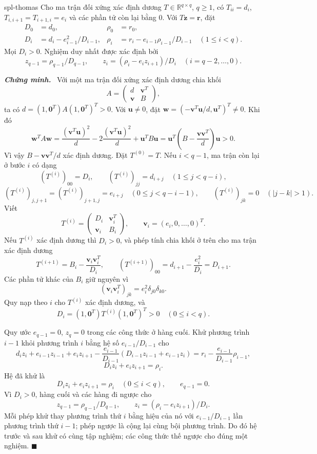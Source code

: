 \documentclass[12pt,a4paper,oneside]{book}
\numberwithin{algorithm}{chapter}
\theoremstyle{definition}
\newenvironment{chungminh}{\par\medskip\noindent\textbf{\textit{\color{mainblue}Chứng minh.}}\ }{\hfill$\blacksquare$\par\medskip}
\newcommand{\R}{\mathbb{R}}
\begin{document}
\begin{dinhly}{}{spl-thomas}
Cho ma trận đối xứng xác định dương $T\in\R^{q\times q}$, $q\geq1$, có $T_{ii}=d_i$, $T_{i,i+1}=T_{i+1,i}=e_i$ và các phần tử còn lại bằng $0$. Với $T\mathbf z=\mathbf r$, đặt
\begin{equation}\label{eq:spl-thomas}
 \begin{aligned}
 D_0&=d_0,&\rho_0&=r_0,\\
 D_i&=d_i-e_{i-1}^2/D_{i-1},&
 \rho_i&=r_i-e_{i-1}\rho_{i-1}/D_{i-1}\quad(1\leq i<q).
 \end{aligned}
\end{equation}
Mọi $D_i>0$. Nghiệm duy nhất được xác định bởi
\[
 z_{q-1}=\rho_{q-1}/D_{q-1},\qquad
 z_i=(\rho_i-e_iz_{i+1})/D_i\quad(i=q-2,\ldots,0).
\]
\end{dinhly}
\begin{chungminh}
Với một ma trận đối xứng xác định dương chia khối
\[
 A=\begin{pmatrix}d&\mathbf v^T\\\mathbf v&B\end{pmatrix},
\]
ta có $d=(1,\mathbf0^T)A(1,\mathbf0^T)^T>0$. Với $\mathbf u\ne0$, đặt $\mathbf w=(-\mathbf v^T\mathbf u/d,\mathbf u^T)^T\ne0$. Khi đó
\[
 \mathbf w^TA\mathbf w
 =\frac{(\mathbf v^T\mathbf u)^2}{d}-2\frac{(\mathbf v^T\mathbf u)^2}{d}+\mathbf u^TB\mathbf u
 =\mathbf u^T\left(B-\frac{\mathbf v\mathbf v^T}{d}\right)\mathbf u>0.
\]
Vì vậy $B-\mathbf v\mathbf v^T/d$ xác định dương. Đặt $T^{(0)}=T$. Nếu $i<q-1$, ma trận còn lại ở bước $i$ có dạng
\[
 (T^{(i)})_{00}=D_i,\qquad
 (T^{(i)})_{jj}=d_{i+j}\quad(1\leq j<q-i),
\]
\[
 (T^{(i)})_{j,j+1}=(T^{(i)})_{j+1,j}=e_{i+j}
 \quad(0\leq j<q-i-1),\qquad
 (T^{(i)})_{jk}=0\quad(|j-k|>1).
\]
Viết
\[
 T^{(i)}=
 \begin{pmatrix}D_i&\mathbf v_i^T\\\mathbf v_i&B_i\end{pmatrix},
 \qquad \mathbf v_i=(e_i,0,\ldots,0)^T.
\]
Nếu $T^{(i)}$ xác định dương thì $D_i>0$, và phép tính chia khối ở trên cho ma trận xác định dương
\[
 T^{(i+1)}
 =B_i-\frac{\mathbf v_i\mathbf v_i^T}{D_i},\qquad
 (T^{(i+1)})_{00}=d_{i+1}-\frac{e_i^2}{D_i}=D_{i+1}.
\]
Các phần tử khác của $B_i$ giữ nguyên vì
\[
 (\mathbf v_i\mathbf v_i^T)_{jk}
 =e_i^2\delta_{j0}\delta_{k0}.
\]
Quy nạp theo $i$ cho $T^{(i)}$ xác định dương, và
\[
 D_i=(1,\mathbf0^T)T^{(i)}(1,\mathbf0^T)^T>0
 \quad(0\leq i<q).
\]

Quy ước $e_{q-1}=0$, $z_q=0$ trong các công thức ở hàng cuối. Khử phương trình $i-1$ khỏi phương trình $i$ bằng hệ số $e_{i-1}/D_{i-1}$ cho
\[
 d_i z_i+e_{i-1}z_{i-1}+e_i z_{i+1}
 -\frac{e_{i-1}}{D_{i-1}}(D_{i-1}z_{i-1}+e_{i-1}z_i)
 =r_i-\frac{e_{i-1}}{D_{i-1}}\rho_{i-1},
\]
\[
 D_i z_i+e_i z_{i+1}=\rho_i.
\]
Hệ đã khử là
\[
 D_i z_i+e_i z_{i+1}=\rho_i\quad(0\leq i<q),\qquad e_{q-1}=0.
\]
Vì $D_i>0$, hàng cuối và các hàng đi ngược cho
\[
 z_{q-1}=\rho_{q-1}/D_{q-1},\qquad
 z_i=(\rho_i-e_i z_{i+1})/D_i.
\]
Mỗi phép khử thay phương trình thứ $i$ bằng hiệu của nó với $e_{i-1}/D_{i-1}$ lần phương trình thứ $i-1$; phép ngược là cộng lại cùng bội phương trình. Do đó hệ trước và sau khử có cùng tập nghiệm; các công thức thế ngược cho đúng một nghiệm.
\end{chungminh}
\end{document}
